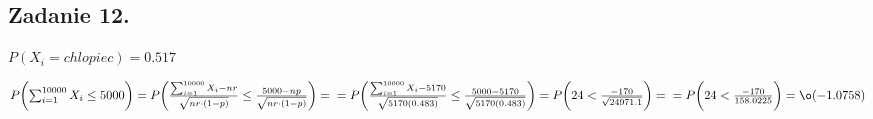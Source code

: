 \subsection{Zadanie 12.}

$P(X_i = chlopiec) = 0.517$

$P \biggl ( \sum_{i=1}^{10000} X_i \le 5000 \biggr ) = P \biggl ( \frac{\sum_{i=1}^{10000} X_i - nr}{\sqrt{nr \cdot (1-p)}} \le \frac{5000-np}{\sqrt{nr \cdot (1-p)}} \biggr ) =
\\ = P \biggl ( \frac{\sum_{i=1}^{10000} X_i-5170}{\sqrt{5170(0.483)}} \le \frac{5000-5170}{\sqrt{5170(0.483)}} \biggr ) = P \biggl ( 24 < \frac{-170}{\sqrt{24971.1}} \biggr ) =
\\ = P \biggl (24 < \frac{-170}{158.0225} \biggr ) = \o (-1.0758)$
